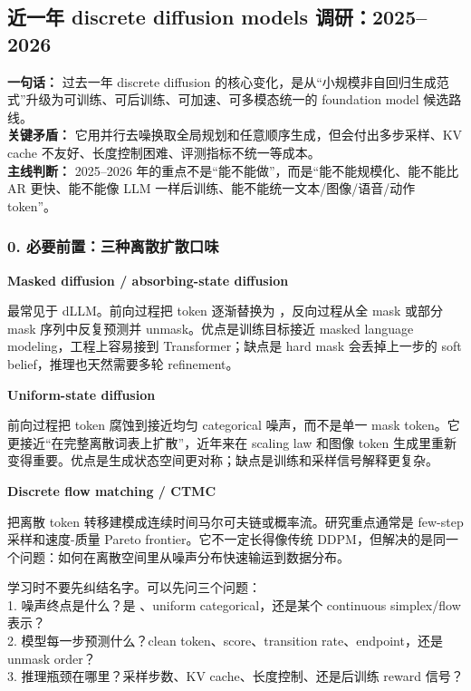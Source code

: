 
\subsection{近一年 discrete diffusion models 调研：2025--2026}

\begin{conceptbox}
\textbf{一句话：} 过去一年 discrete diffusion 的核心变化，是从“小规模非自回归生成范式”升级为可训练、可后训练、可加速、可多模态统一的 foundation model 候选路线。\\
\textbf{关键矛盾：} 它用并行去噪换取全局规划和任意顺序生成，但会付出多步采样、KV cache 不友好、长度控制困难、评测指标不统一等成本。\\
\textbf{主线判断：} 2025--2026 年的重点不是“能不能做”，而是“能不能规模化、能不能比 AR 更快、能不能像 LLM 一样后训练、能不能统一文本/图像/语音/动作 token”。
\end{conceptbox}

\subsubsection{0. 必要前置：三种离散扩散口味}

\textbf{Masked diffusion / absorbing-state diffusion}

最常见于 dLLM。前向过程把 token 逐渐替换为 \code{[MASK]}，反向过程从全 mask 或部分 mask 序列中反复预测并 unmask。优点是训练目标接近 masked language modeling，工程上容易接到 Transformer；缺点是 hard mask 会丢掉上一步的 soft belief，推理也天然需要多轮 refinement。

\textbf{Uniform-state diffusion}

前向过程把 token 腐蚀到接近均匀 categorical 噪声，而不是单一 mask token。它更接近“在完整离散词表上扩散”，近年来在 scaling law 和图像 token 生成里重新变得重要。优点是生成状态空间更对称；缺点是训练和采样信号解释更复杂。

\textbf{Discrete flow matching / CTMC}

把离散 token 转移建模成连续时间马尔可夫链或概率流。研究重点通常是 few-step 采样和速度-质量 Pareto frontier。它不一定长得像传统 DDPM，但解决的是同一个问题：如何在离散空间里从噪声分布快速输运到数据分布。

\begin{intubox}
学习时不要先纠结名字。可以先问三个问题：\\
1. 噪声终点是什么？是 \code{[MASK]}、uniform categorical，还是某个 continuous simplex/flow 表示？\\
2. 模型每一步预测什么？clean token、score、transition rate、endpoint，还是 unmask order？\\
3. 推理瓶颈在哪里？采样步数、KV cache、长度控制、还是后训练 reward 信号？
\end{intubox}

